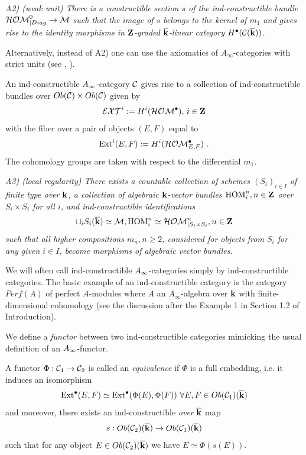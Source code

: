 \documentclass[12pt]{article}
\begin{document}
{\it A2) (weak unit) There is a constructible section $s$ of the ind-constructible bundle
${\cal HOM}^0_{|Diag}\to {\cal M}$ such that the image of $s$ belongs to
the kernel of $m_1$ and gives rise to the identity morphisms in ${\bf Z}$-graded ${\overline{\bf k}}$-linear category $H^{\bullet}({\mathcal C}({\overline{\bf k}}))$.}

Alternatively, instead of A2) one can use the axiomatics of $A_\infty$-categories with strict units (see \cite{KoSo3}, \cite{LyuMan}).



An ind-constructible $A_{\infty}$-category ${\mathcal C}$ gives rise to a collection of ind-constructible bundles over $Ob({\mathcal C})\times Ob({\mathcal C})$ given by  $${\cal EXT}^i:=H^{i}({\cal HOM}^\bullet),\, i\in {\bf Z}$$ with the fiber over a pair of objects $(E,F)$ equal to 
$$\operatorname{Ext}^i(E,F):=H^{i}({\cal HOM}_{E,F}^\bullet)\,\,.$$ The cohomology groups are taken with respect to the differential $m_1$.





 {\it A3) (local regularity) There exists a countable collection of schemes $(S_i)_{i\in I}$ of finite type over ${\bf k}$,  
 a collection of algebraic ${\bf k}$-vector
bundles $\operatorname{HOM}^n_{i}, n\in {\bf Z}$ over $S_i\times S_i$ for all $i$,
and  ind-constructible identifications 
$$\sqcup_i S_i({\overline{\bf k}})\simeq {\cal M}, \operatorname{HOM}^n_{i}\simeq {\cal HOM}_{|S_i\times S_i}^n, n\in {\bf Z}$$
 such that all higher compositions $m_n,n\geqslant 2$,
considered for objects from $S_i$ for any given $i\in I$, become morphisms of algebraic vector bundles.}



We will often call ind-constructible $A_{\infty}$-categories simply by ind-constructible categories. 
The basic example of an ind-constructible category is the category $Perf(A)$ of perfect $A$-modules where $A$ an $A_\infty$-algebra over ${\bf k}$ with finite-dimensional cohomology
(see the discussion after the Example 1 in Section 1.2 of Introduction).




We define a {\it functor} between two ind-constructible categories mimicking the usual definition of an $A_{\infty}$-functor.


A functor $\Phi:{\cal C}_1\to {\cal C}_2$ is called an {\it equivalence} if $\Phi$ is a full embedding,  i.e. it
induces an isomorphism
$$\operatorname{Ext}^\bullet(E,F)\simeq \operatorname{Ext}^\bullet(\Phi(E),\Phi(F))\,\,\forall E,F\in Ob({\mathcal C}_1)({\overline{\bf k}})$$
 and moreover, there exists an   ind-constructible {\it over }${\overline{\bf k}}$ map $$s:Ob({\mathcal C}_2)({\overline{\bf k}})\to Ob({\mathcal C}_1)({\overline{\bf k}})$$ such
that for any object $E\in Ob({\mathcal C}_2)({\overline{\bf k}})$ we have $E\simeq \Phi(s(E))$.
\end{document}
